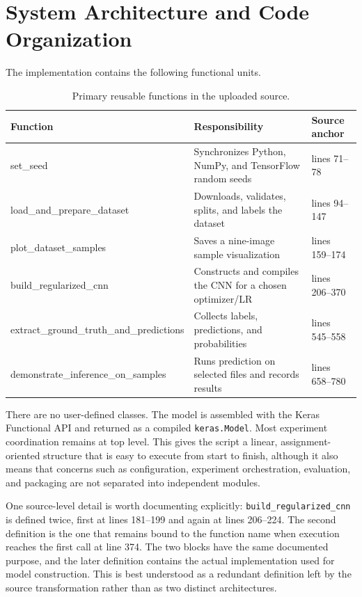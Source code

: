 \documentclass[11pt,a4paper]{article}
\newcommand{\code}[1]{\texttt{#1}}
\begin{document}
\section{System Architecture and Code Organization}
The implementation contains the following functional units.

\begin{table}[ht]
\centering
\small
\begin{tabularx}{\textwidth}{>{\ttfamily}p{} X p{}}
\toprule
Function & Responsibility & Source anchor \\
\midrule
set\_seed & Synchronizes Python, NumPy, and TensorFlow random seeds & lines 71--78 \\
load\_and\_prepare\_dataset & Downloads, validates, splits, and labels the dataset & lines 94--147 \\
plot\_dataset\_samples & Saves a nine-image sample visualization & lines 159--174 \\
build\_regularized\_cnn & Constructs and compiles the CNN for a chosen optimizer/LR & lines 206--370 \\
extract\_ground\_truth\_and\_predictions & Collects labels, predictions, and probabilities & lines 545--558 \\
demonstrate\_inference\_on\_samples & Runs prediction on selected files and records results & lines 658--780 \\
\bottomrule
\end{tabularx}
\caption{Primary reusable functions in the uploaded source.}
\end{table}

There are no user-defined classes. The model is assembled with the Keras Functional API and returned as a compiled \code{keras.Model}. Most experiment coordination remains at top level. This gives the script a linear, assignment-oriented structure that is easy to execute from start to finish, although it also means that concerns such as configuration, experiment orchestration, evaluation, and packaging are not separated into independent modules.

One source-level detail is worth documenting explicitly: \code{build\_regularized\_cnn} is defined twice, first at lines 181--199 and again at lines 206--224. The second definition is the one that remains bound to the function name when execution reaches the first call at line 374. The two blocks have the same documented purpose, and the later definition contains the actual implementation used for model construction. This is best understood as a redundant definition left by the source transformation rather than as two distinct architectures.
\end{document}
